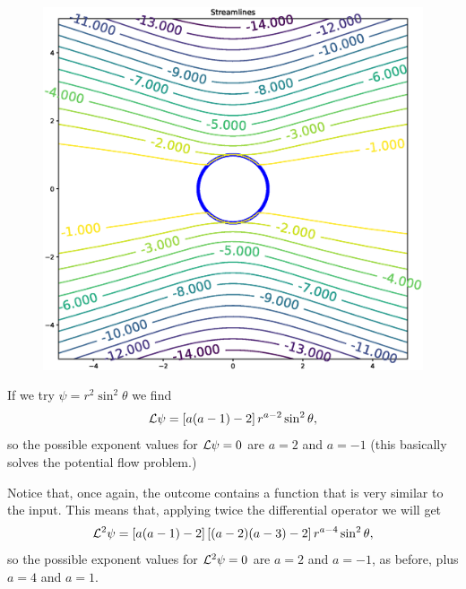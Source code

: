 \begin{figure}
  \centering
  \includegraphics[width=0.8\linewidth]{figures/creeping_flow_past_sphere_moving}
  \caption{\label{fig:creeping_flow_past_sphere_moving}}
\end{figure}




If we try $\psi=r^2 \sin^2\theta$ we find
\[
  {\cal L} \psi = \left[ a(a-1) - 2 \right] r^{a-2} \sin^2\theta ,
\]
so the possible exponent values for ${\cal L} \psi = 0$ are $a=2$ and
$a=-1$ (this basically solves the potential flow problem.)

Notice that, once again, the outcome contains a function that is very
similar to the input. This means that, applying twice the differential
operator we will get
\[
  {\cal L}^2 \psi =
  \left[   a  (a-1) - 2 \right]
  \left[ (a-2)(a-3) - 2 \right]
  r^{a-4} \sin^2\theta ,
\]
so  the possible exponent values for ${\cal L}^2 \psi = 0$ are $a=2$ and
$a=-1$, as before, plus $a=4$ and $a=1$.

